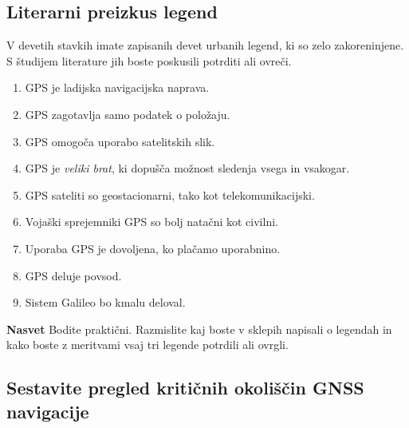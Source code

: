 \subsection{Literarni preizkus legend}
\label{subsec:GnssPrak_LitPreizkusLegend}

V devetih stavkih imate zapisanih devet urbanih legend, ki so zelo zakoreninjene. S študijem literature jih boste poskusili potrditi ali ovreči.

\begin{enumerate}
	\item GPS je ladijska navigacijska naprava.
	\item GPS zagotavlja samo podatek o položaju.
	\item GPS omogoča uporabo satelitskih slik.
	\item GPS je \textit{veliki brat}, ki dopušča možnost sledenja vsega in vsakogar.
	\item GPS sateliti so geostacionarni, tako kot telekomunikacijski.
	\item Vojaški sprejemniki GPS so bolj natačni kot civilni.
	\item Uporaba GPS je dovoljena, ko plačamo uporabnino.
	\item GPS deluje povsod.
	\item Sistem Galileo bo kmalu deloval.
\end{enumerate}


\textbf{Nasvet} Bodite praktični. Razmislite kaj boste v sklepih napisali o legendah in kako boste z meritvami vsaj tri legende potrdili ali ovrgli.






\subsection{Sestavite pregled kritičnih okoliščin GNSS navigacije}
\label{subsec:GnssPrak_Podat}


